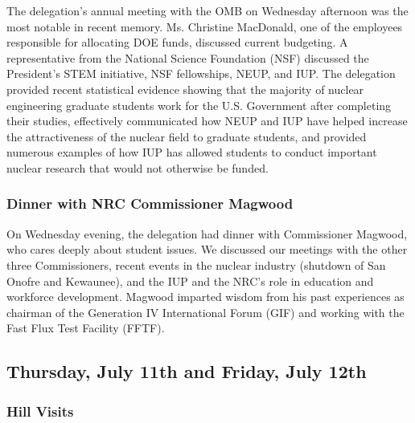 The delegation's annual meeting with the OMB on Wednesday afternoon was the most
notable in recent memory. Ms. Christine MacDonald, one of the employees
responsible for allocating DOE funds, discussed current budgeting. A
representative from the National Science Foundation (NSF) discussed the
President's STEM initiative, NSF fellowships, NEUP, and IUP. The delegation
provided recent statistical evidence showing that the majority of nuclear
engineering graduate students work for the U.S. Government after completing
their studies, effectively communicated how NEUP and IUP have helped increase
the attractiveness of the nuclear field to graduate students, and provided
numerous examples of how IUP has allowed students to conduct important nuclear
research that would not otherwise be funded.
 
\subsubsection*{Dinner with NRC Commissioner Magwood}

On Wednesday evening, the delegation had dinner with Commissioner Magwood, who
cares deeply about student issues. We discussed our meetings with the other
three Commissioners, recent events in the nuclear industry (shutdown of San
Onofre and Kewaunee), and the IUP and the NRC's role in education and workforce
development. Magwood imparted wisdom from his past experiences as chairman of
the Generation IV International Forum (GIF) and working with the Fast Flux Test
Facility (FFTF).

\subsection*{Thursday, July 11th and Friday, July 12th}

\subsubsection*{Hill Visits}

